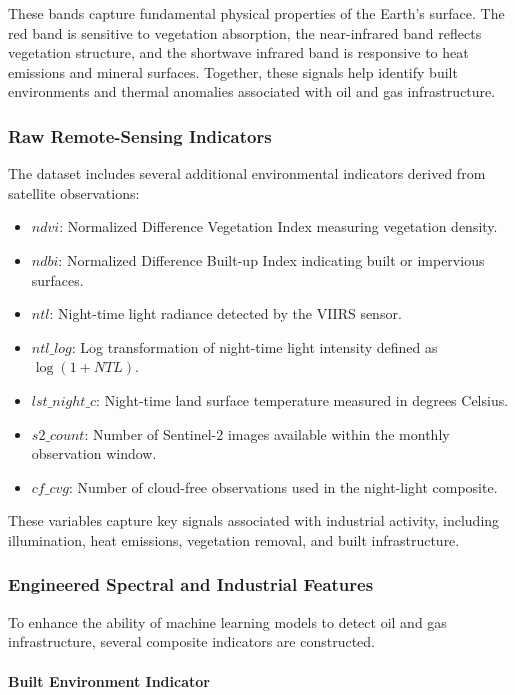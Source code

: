 \documentclass[12pt]{article}
\begin{document}
These bands capture fundamental physical properties of the Earth's surface. The red band is sensitive to vegetation absorption, the near-infrared band reflects vegetation structure, and the shortwave infrared band is responsive to heat emissions and mineral surfaces. Together, these signals help identify built environments and thermal anomalies associated with oil and gas infrastructure.

\subsubsection{Raw Remote-Sensing Indicators}

The dataset includes several additional environmental indicators derived from satellite observations:

\begin{itemize}
\item $ndvi$: Normalized Difference Vegetation Index measuring vegetation density.
\item $ndbi$: Normalized Difference Built-up Index indicating built or impervious surfaces.
\item $ntl$: Night-time light radiance detected by the VIIRS sensor.
\item $ntl\_log$: Log transformation of night-time light intensity defined as $\log(1 + NTL)$.
\item $lst\_night\_c$: Night-time land surface temperature measured in degrees Celsius.
\item $s2\_count$: Number of Sentinel-2 images available within the monthly observation window.
\item $cf\_cvg$: Number of cloud-free observations used in the night-light composite.
\end{itemize}

These variables capture key signals associated with industrial activity, including illumination, heat emissions, vegetation removal, and built infrastructure.

\subsubsection{Engineered Spectral and Industrial Features}

To enhance the ability of machine learning models to detect oil and gas infrastructure, several composite indicators are constructed.

\paragraph{Built Environment Indicator}
\end{document}
